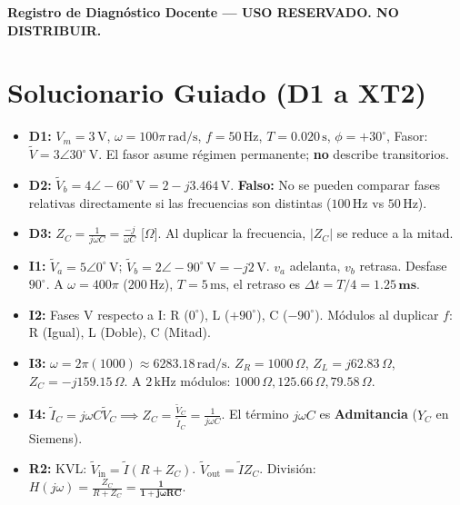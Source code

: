 \documentclass[11pt, a4paper]{article}
\begin{document}
\begin{tcolorbox}[colback=warnred!5!white, colframe=warnred, title=\textbf{Artefacto A2: Clave Docente y Rúbrica Formativa (EC4 / W15S3)}]
    \centering \textbf{Registro de Diagnóstico Docente — USO RESERVADO. NO DISTRIBUIR.}
\end{tcolorbox}

\section*{Solucionario Guiado (D1 a XT2)}
\begin{itemize}\setlength\itemsep{0.15cm}
    \item \textbf{D1:} $V_m = 3\,\text{V}$, $\omega = 100\pi\,\text{rad/s}$, $f = 50\,\text{Hz}$, $T = 0.020\,\text{s}$, $\phi = +30^\circ$, Fasor: $\tilde{V} = 3\angle 30^\circ\,\text{V}$. El fasor asume régimen permanente; \textbf{no} describe transitorios.
    \item \textbf{D2:} $\tilde{V}_b = 4\angle -60^\circ\,\text{V} = 2 - j3.464\,\text{V}$. \textbf{Falso:} No se pueden comparar fases relativas directamente si las frecuencias son distintas ($100\,\text{Hz}$ vs $50\,\text{Hz}$).
    \item \textbf{D3:} $Z_C = \frac{1}{j\omega C} = \frac{-j}{\omega C}$ [$\Omega$]. Al duplicar la frecuencia, $|Z_C|$ se reduce a la mitad.
    \item \textbf{I1:} $\tilde{V}_a = 5\angle 0^\circ\,\text{V}$; $\tilde{V}_b = 2\angle -90^\circ\,\text{V} = -j2\,\text{V}$. $v_a$ adelanta, $v_b$ retrasa. Desfase $90^\circ$. A $\omega = 400\pi$ ($200\,\text{Hz}$), $T = 5\,\text{ms}$, el retraso es $\Delta t = T/4 = \mathbf{1.25\,\text{ms}}$.
    \item \textbf{I2:} Fases V respecto a I: R ($0^\circ$), L ($+90^\circ$), C ($-90^\circ$). Módulos al duplicar $f$: R (Igual), L (Doble), C (Mitad).
    \item \textbf{I3:} $\omega = 2\pi(1000) \approx 6283.18\,\text{rad/s}$. $Z_R = 1000\,\Omega$, $Z_L = j62.83\,\Omega$, $Z_C = -j159.15\,\Omega$. A $2\,\text{kHz}$ módulos: $1000\,\Omega, 125.66\,\Omega, 79.58\,\Omega$.
    \item \textbf{I4:} $\tilde{I}_C = j\omega C \tilde{V}_C \implies Z_C = \frac{\tilde{V}_C}{\tilde{I}_C} = \frac{1}{j\omega C}$. El término $j\omega C$ es \textbf{Admitancia} ($Y_C$ en Siemens).
    \item \textbf{R2:} KVL: $\tilde{V}_{\text{in}} = \tilde{I}(R + Z_C)$. $\tilde{V}_{\text{out}} = \tilde{I}Z_C$. División: $H(j\omega) = \frac{Z_C}{R+Z_C} = \mathbf{\frac{1}{1 + j\omega RC}}$.

\end{itemize}
\end{document}
